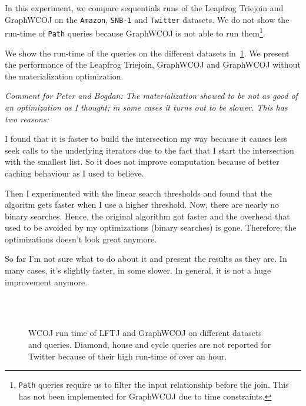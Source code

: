 In this experiment, we compare sequentials runs of the Leapfrog Triejoin and GraphWCOJ
on the \texttt{Amazon}, \texttt{SNB-1} and \texttt{Twitter} datasets.
We do not show the run-time of \texttt{Path} queries because GraphWCOJ is not able to run
them\footnote{\texttt{Path} queries require us to filter the input relationship before
the join. This has not been implemented for GraphWCOJ due to time constraints.}.

We show the run-time of the queries on  the different datasets in~\cref{fig:lftj-graphWCOJ}.
We present the performance of the Leapfrog Triejoin, GraphWCOJ and GraphWCOJ without the
materialization optimization.

{\itshape Comment for Peter and Bogdan:
  The materialization showed to be not as good of an optimization as I thought;
  in some cases it turns out to be slower.
  This has two reasons:

  I found that it is faster to build the intersection my way because it causes less seek
  calls to the underlying iterators due to the fact that I start the intersection with the
  smallest list.
  So it does not improve computation because of better caching behaviour as I used to believe.

  Then I experimented with the linear search thresholds and found that the algoritm gets faster
  when I use a higher threshold.
  Now, there are nearly no binary searches.
  Hence, the original algorithm got faster and the overhead that used to be avoided by my
  optimizations (binary searches) is gone.
  Therefore, the optimizations doesn't look great anymore.

  So far I'm not sure what to do about it and present the results as they are.
  In many cases, it's slightly faster, in some slower.
  In general, it is not a huge improvement anymore.
}



\begin{figure}
    \subfloat[Amazon-0302]{}
    \subfloat[Amazon-0601]{
      
      
    }\\
    \subfloat[SNB-1]{
    
    
    }\\
    \subfloat[Twitter]{
    
%    
    }
    \caption{
      WCOJ run time of \textsc{LFTJ} and GraphWCOJ on different datasets and queries.
      Diamond, house and cycle queries are not reported for Twitter because of their high
      run-time of over an hour.
    }
    \label{fig:lftj-graphWCOJ}
\end{figure}

